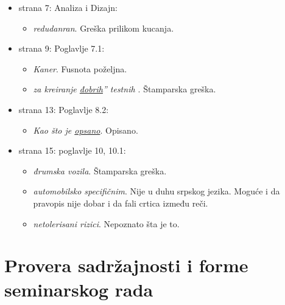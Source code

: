 \documentclass[a4paper]{report}
\begin{document}
\begin{itemize}
\item strana 7: Analiza i Dizajn:
  \begin{itemize}
  \item {\em{redudanran}}. Greška prilikom kucanja.
  \end{itemize}
\end{itemize}

\begin{itemize}
\item strana 9: Poglavlje 7.1:
  \begin{itemize}
  \item {\em{Kaner}}. Fusnota poželjna.
  \item {\em{ za kreiranje {\underline{đobrih}}'' testnih }}. Štamparska greška.
  \end{itemize}
\end{itemize}

\begin{itemize}
\item strana 13: Poglavlje 8.2:
  \begin{itemize}
  \item {\em{Kao što je {\underline{opsano}}}}. Opisano.
  \end{itemize}
\end{itemize}

\begin{itemize}
\item strana 15: poglavlje 10, 10.1:
  \begin{itemize}
  \item {\em{đrumska vozila}}. Štamparska greška.
  \item {\em{automobilsko specifičnim}}. Nije u duhu srpskog jezika. Moguće i da pravopis nije dobar i da fali crtica između reči.
  \item {\em{netolerisani rizici}}. Nepoznato šta je to.
  \end{itemize}
\end{itemize}


\section{Provera sadržajnosti i forme seminarskog rada}
\end{document}
